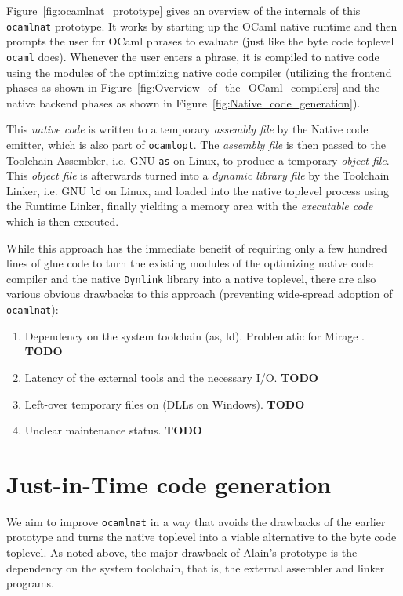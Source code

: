 \documentclass[10pt,a4paper,draft,twocolumn]{article}
\makeatletter
\newcommand{\ie}{i.e.\@\xspace}
\makeatother
\begin{document}
Figure~\ref{fig:ocamlnat_prototype} gives an overview of the internals of this \texttt{ocamlnat} prototype.
It works by starting up the OCaml native runtime and then prompts the user for OCaml phrases to evaluate
(just like the byte code toplevel \texttt{ocaml} does). Whenever the user enters a phrase, it is compiled
to native code using the modules of the optimizing native code compiler (utilizing the frontend phases as
shown in Figure~\ref{fig:Overview_of_the_OCaml_compilers} and the native backend phases as shown in
Figure~\ref{fig:Native_code_generation}).

This \emph{native code} is written to a temporary \emph{assembly file} by the Native code emitter, which
is also part of \texttt{ocamlopt}. The \emph{assembly file} is then passed to the Toolchain Assembler, \ie GNU
\texttt{as} on Linux, to produce a temporary \emph{object file}. This \emph{object file} is afterwards turned
into a \emph{dynamic library file} by the Toolchain Linker, \ie GNU \texttt{ld} on Linux, and loaded into the
native toplevel process using the Runtime Linker, finally yielding a memory area with the \emph{executable code}
which is then executed.

While this approach has the immediate benefit of requiring only a few hundred lines of glue code to turn
the existing modules of the optimizing native code compiler and the native \texttt{Dynlink} library into
a native toplevel, there are also various obvious drawbacks to this approach (preventing wide-spread
adoption of \texttt{ocamlnat}):
\begin{enumerate}
\item Dependency on the system toolchain (as, ld).
  Problematic for Mirage \cite{Mirage11,Madhavapeddy10,Madhavapeddy10hotcloud}.
  \textbf{TODO}
\item Latency of the external tools and the necessary I/O. \textbf{TODO}
\item Left-over temporary files on (DLLs on Windows). \textbf{TODO}
\item Unclear maintenance status. \textbf{TODO}
\end{enumerate}


\section{Just-in-Time code generation} \label{section:Just_in_time_code_generation}

We aim to improve \texttt{ocamlnat} in a way that avoids the drawbacks of the earlier prototype
and turns the native toplevel into a viable alternative to the byte code toplevel. As noted above,
the major drawback of Alain's prototype is the dependency on the system toolchain, that is, the
external assembler and linker programs.
\end{document}
